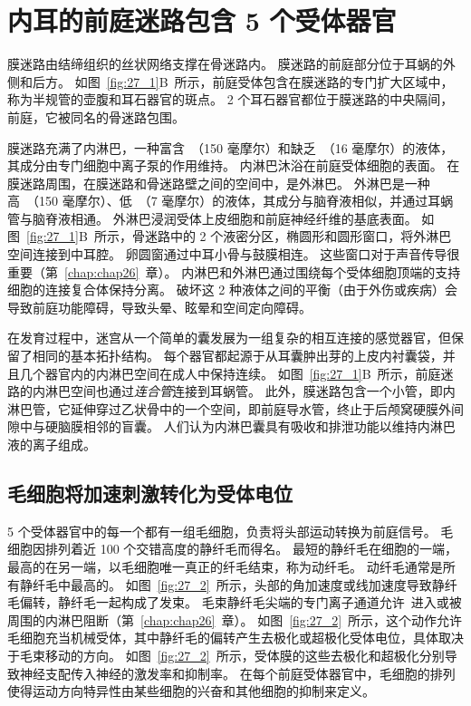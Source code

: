 \section{内耳的前庭迷路包含 5 个受体器官}

膜迷路由结缔组织的丝状网络支撑在骨迷路内。
膜迷路的前庭部分位于耳蜗的外侧和后方。
如图~\ref{fig:27_1}B~所示，前庭受体包含在膜迷路的专门扩大区域中，称为半规管的壶腹和耳石器官的斑点。
2 个耳石器官都位于膜迷路的中央隔间，前庭，它被同名的骨迷路包围。


膜迷路充满了内淋巴，一种富含~（150 毫摩尔）和缺乏~（16 毫摩尔）的液体，其成分由专门细胞中离子泵的作用维持。
内淋巴沐浴在前庭受体细胞的表面。
在膜迷路周围，在膜迷路和骨迷路壁之间的空间中，是外淋巴。
外淋巴是一种高~（150 毫摩尔）、低~（7 毫摩尔）的液体，其成分与脑脊液相似，并通过耳蜗管与脑脊液相通。
外淋巴浸润受体上皮细胞和前庭神经纤维的基底表面。
如图~\ref{fig:27_1}B~所示，骨迷路中的 2 个液密分区，椭圆形和圆形窗口，将外淋巴空间连接到中耳腔。
卵圆窗通过中耳小骨与鼓膜相连。
这些窗口对于声音传导很重要（第~\ref{chap:chap26}~章）。
内淋巴和外淋巴通过围绕每个受体细胞顶端的支持细胞的连接复合体保持分离。
破坏这 2 种液体之间的平衡（由于外伤或疾病）会导致前庭功能障碍，导致头晕、眩晕和空间定向障碍。


在发育过程中，迷宫从一个简单的囊发展为一组复杂的相互连接的感觉器官，但保留了相同的基本拓扑结构。
每个器官都起源于从耳囊肿出芽的上皮内衬囊袋，并且几个器官内的内淋巴空间在成人中保持连续。
如图~\ref{fig:27_1}B~所示，前庭迷路的内淋巴空间也通过\textit{连合管}连接到耳蜗管。
此外，膜迷路包含一个小管，即内淋巴管，它延伸穿过乙状骨中的一个空间，即前庭导水管，终止于后颅窝硬膜外间隙中与硬脑膜相邻的盲囊。
人们认为内淋巴囊具有吸收和排泄功能以维持内淋巴液的离子组成。



\subsection{毛细胞将加速刺激转化为受体电位}

5 个受体器官中的每一个都有一组毛细胞，负责将头部运动转换为前庭信号。
毛细胞因排列着近 100 个交错高度的静纤毛而得名。
最短的静纤毛在细胞的一端，最高的在另一端，以毛细胞唯一真正的纤毛结束，称为动纤毛。
动纤毛通常是所有静纤毛中最高的。
如图~\ref{fig:27_2}~所示，头部的角加速度或线加速度导致静纤毛偏转，静纤毛一起构成了发束。
毛束静纤毛尖端的专门离子通道允许~进入或被周围的内淋巴阻断（第~\ref{chap:chap26}~章）。
如图~\ref{fig:27_2}~所示，这个动作允许毛细胞充当机械受体，其中静纤毛的偏转产生去极化或超极化受体电位，具体取决于毛束移动的方向。
如图~\ref{fig:27_2}~所示，受体膜的这些去极化和超极化分别导致神经支配传入神经的激发率和抑制率。
在每个前庭受体器官中，毛细胞的排列使得运动方向特异性由某些细胞的兴奋和其他细胞的抑制来定义。


